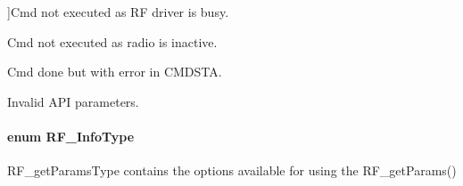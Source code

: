 \begin{Desc}
\begin{description}
{}]Cmd not executed as R\+F driver is busy. \item[{\em 
R\+F\+\_\+\+Stat\+Radio\+Inactive\+Error\label{_r_f_8h_afdc219ddabc8427ecd552a6c78d9988fa80848b887667038bbfa4a2d14e83b193}
}]Cmd not executed as radio is inactive. \item[{\em 
R\+F\+\_\+\+Stat\+Cmd\+Done\+Error\label{_r_f_8h_afdc219ddabc8427ecd552a6c78d9988fa612e247f325ff085321b8e243f6b1d3d}
}]Cmd done but with error in C\+M\+D\+S\+T\+A. \item[{\em 
R\+F\+\_\+\+Stat\+Invalid\+Params\+Error\label{_r_f_8h_afdc219ddabc8427ecd552a6c78d9988face124dc75bad005452467d6f29351301}
}]Invalid A\+P\+I parameters. \end{description}
\end{Desc}
\paragraph[{R\+F\+\_\+\+Info\+Type}]{\setlength{\rightskip}{0pt plus 5cm}enum {\bf R\+F\+\_\+\+Info\+Type}}\label{_r_f_8h_a22596109459422a7a4d4f386dffbb8fa}


R\+F\+\_\+get\+Params\+Type contains the options available for using the R\+F\+\_\+get\+Params() 

